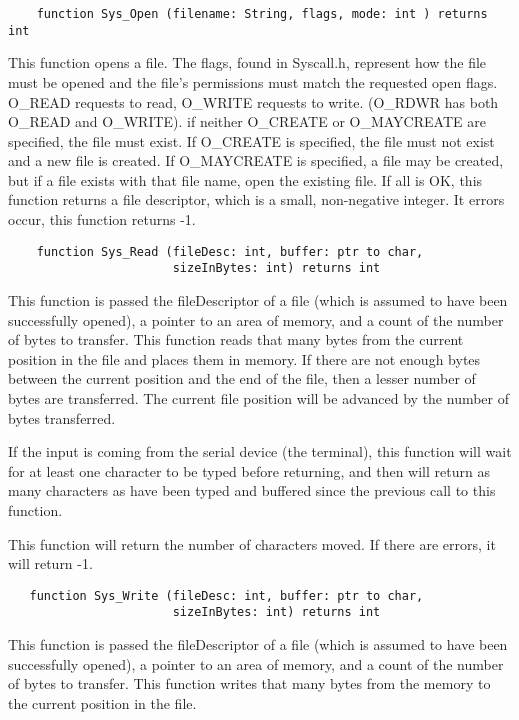 \documentclass[12pt]{article}
\begin{document}
\begin{verbatim}
    function Sys_Open (filename: String, flags, mode: int ) returns int
\end{verbatim}

This function opens a file. The flags, found in Syscall.h, represent
how the file must be opened and the file's permissions must match the
requested open flags.  O\_READ requests to read, O\_WRITE requests
to write. (O\_RDWR has both O\_READ and O\_WRITE).  if neither
O\_CREATE or O\_MAYCREATE are specified, the file must exist.  If
O\_CREATE is specified, the file must not exist and a new file is
created.  If O\_MAYCREATE is specified, a file may be created, but if a
file exists with that file name, open the existing file.  If all
is OK, this function returns a file descriptor, which is a small,
non-negative integer.  It errors occur, this function returns -1.

\begin{verbatim}
    function Sys_Read (fileDesc: int, buffer: ptr to char, 
                       sizeInBytes: int) returns int
\end{verbatim}

This function is passed the fileDescriptor of a file (which is assumed
to have been successfully opened), a pointer to an area of memory, and
a count of the number of bytes to transfer.  This function reads that
many bytes from the current position in the file and places them in
memory.  If there are not enough bytes between the current position
and the end of the file, then a lesser number of bytes are
transferred.  The current file position will be advanced by the number
of bytes transferred.

If the input is coming from the serial device (the terminal), this
function will wait for at least one character to be typed before
returning, and then will return as many characters as have been typed
and buffered since the previous call to this function.

This function will return the number of characters moved.  If there
are errors, it will return -1.

\begin{verbatim}
   function Sys_Write (fileDesc: int, buffer: ptr to char,
                       sizeInBytes: int) returns int
\end{verbatim}

This function is passed the fileDescriptor of a file (which is assumed
to have been successfully opened), a pointer to an area of memory, and
a count of the number of bytes to transfer.  This function writes that
many bytes from the memory to the current position in the file.
\end{document}
